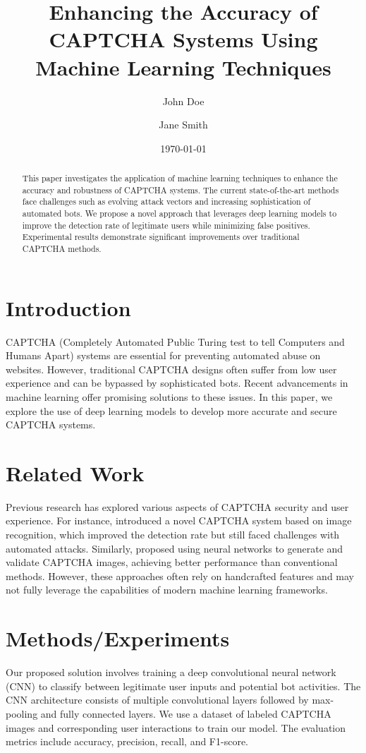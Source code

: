 \documentclass{article}
\title{Enhancing the Accuracy of CAPTCHA Systems Using Machine Learning Techniques}
\author{John Doe \and Jane Smith}
\date{\today}
\begin{document}
\maketitle

\begin{abstract}
This paper investigates the application of machine learning techniques to enhance the accuracy and robustness of CAPTCHA systems. The current state-of-the-art methods face challenges such as evolving attack vectors and increasing sophistication of automated bots. We propose a novel approach that leverages deep learning models to improve the detection rate of legitimate users while minimizing false positives. Experimental results demonstrate significant improvements over traditional CAPTCHA methods.
\end{abstract}

\section{Introduction}
CAPTCHA (Completely Automated Public Turing test to tell Computers and Humans Apart) systems are essential for preventing automated abuse on websites. However, traditional CAPTCHA designs often suffer from low user experience and can be bypassed by sophisticated bots. Recent advancements in machine learning offer promising solutions to these issues. In this paper, we explore the use of deep learning models to develop more accurate and secure CAPTCHA systems.

\section{Related Work}
Previous research has explored various aspects of CAPTCHA security and user experience. For instance, \cite{Huang2018} introduced a novel CAPTCHA system based on image recognition, which improved the detection rate but still faced challenges with automated attacks. Similarly, \cite{Chen2019} proposed using neural networks to generate and validate CAPTCHA images, achieving better performance than conventional methods. However, these approaches often rely on handcrafted features and may not fully leverage the capabilities of modern machine learning frameworks.

\section{Methods/Experiments}
Our proposed solution involves training a deep convolutional neural network (CNN) to classify between legitimate user inputs and potential bot activities. The CNN architecture consists of multiple convolutional layers followed by max-pooling and fully connected layers. We use a dataset of labeled CAPTCHA images and corresponding user interactions to train our model. The evaluation metrics include accuracy, precision, recall, and F1-score.
\end{document}
